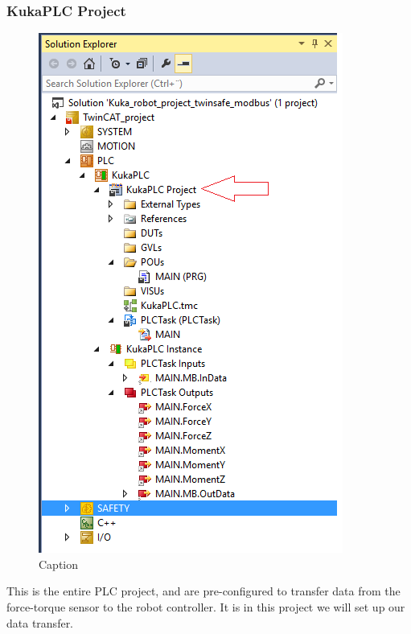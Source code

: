 \documentclass{article}
\begin{document}
\newpage

\subsubsection{KukaPLC Project}
\begin{figure}[!h]
    \centering
    \includegraphics[scale=0.7]{pictures/TC3_overview/TC3_KukaPLC.png}
    \caption{Caption}
    
\end{figure}
This is the entire PLC project, and are pre-configured to transfer data from the force-torque sensor to the robot controller. It is in this project we will set up our data transfer.  

\newpage
\end{document}
